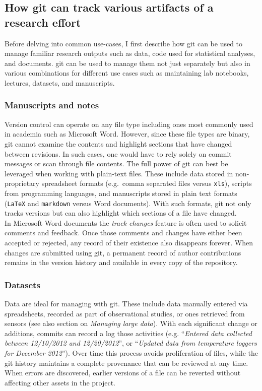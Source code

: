 \documentclass[]{article}
\begin{document}
\subsection{How git can track various artifacts of a research effort}

Before delving into common use-cases, I first describe how git can be
used to manage familiar research outputs such as data, code used for
statistical analyses, and documents. git can be used to manage them not
just separately but also in various combinations for different use cases
such as maintaining lab notebooks, lectures, datasets, and manuscripts.

\subsubsection{Manuscripts and notes}

Version control can operate on any file type including ones most
commonly used in academia such as Microsoft Word. However, since these
file types are binary, git cannot examine the contents and highlight
sections that have changed between revisions. In such cases, one would
have to rely solely on commit messages or scan through file contents.
The full power of git can best be leveraged when working with plain-text
files. These include data stored in non-proprietary spreadsheet formats
(e.g.~comma separated files versus \texttt{xls}), scripts from
programming languages, and manuscripts stored in plain text formats
(\texttt{LaTeX} and \texttt{markdown} versus Word documents). With such
formats, git not only tracks versions but can also highlight which
sections of a file have changed.\\In Microsoft Word documents the
\emph{track changes} feature is often used to solicit comments and
feedback. Once those comments and changes have either been accepted or
rejected, any record of their existence also disappears forever. When
changes are submitted using git, a permanent record of author
contributions remains in the version history and available in every copy
of the repository.

\subsubsection{Datasets}

Data are ideal for managing with git. These include data manually
entered via spreadsheets, recorded as part of observational studies, or
ones retrieved from sensors (see also section on \emph{Managing large
data}). With each significant change or additions, commits can record a
log those activities (e.g. ``\emph{Entered data collected between
12/10/2012 and 12/20/2012}'', or ``\emph{Updated data from temperature
loggers for December 2012}''). Over time this process avoids
proliferation of files, while the git history maintains a complete
provenance that can be reviewed at any time. When errors are discovered,
earlier versions of a file can be reverted without affecting other
assets in the project.
\end{document}
